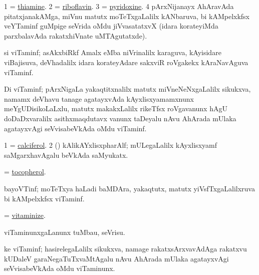 \noindent 
\gl{\pagu}
\expl{}
\bmng
\bnum
\num{1} = \hyperref{kandict_t.pdf}{T}{thiamine}{thiamine}. 
\num{2} = \hyperref{kandict_r.pdf}{R}{riboflavin}{riboflavin}. 
\num{3} = \hyperref{kandict_p.pdf}{P}{pyridoxine}{pyridoxine}. 
\num{4} pArxNijanayx AhAravAda pitatxjanakAMga, miVnu matutx moTeTxgaLalilx kANbaruva, bi kAMpelxkfsx veYTaminf guMpige seVrida oMdu jiVvasatatxvX (idara korateyiMda parxbalavAda rakatxhiVnate uMTAgutatxde). 
\enum
\emng
\eentry

\bentry
{}
\gl{\nA}
\expl{}
\bmng
 si viTaminf; asAkxbiRkf Amalx eMba niVrinalilx karaguva, kAyisidare viBajisuva, deVhadalilx idara korateyAdare sakxviR roVgakekx kAraNavAguva viTaminf. 
\emng
\eentry

\bentry
{}
\gl{\nA}
\expl{}
\bmng
Di viTaminf; pArxNigaLa yakaqtitxnalilx matutx miVneNeNxgaLalilx sikukxva, namamx deVhavu tanage agatayxvAda kAyxlisxyamamxnunx meYgUDisikoLaLxlu, matutx makakxLalilx rikeTfsx roVgavanunx hAgU doDaDxvaralilx asithxmaqdutavx  vanunx taDeyalu nAvu AhArada mUlaka agatayxvAgi seVvisabeVkAda oMdu viTaminf. 
\emng

\noindent 
\gl{\pagu}
\expl{}
\bmng
\bnum
\num{1} = \hyperref{kandict_c.pdf}{C}{calciferol}{calciferol}. 
\num{2} (\jiVra) kAlikAYxlisxpharAlf; mULegaLalilx kAyxlisxyamf saMgarxhavAgalu beVkAda saMyukatx. 
\enum
\emng
\eentry

\bentry
{}
\gl{\nA}
\expl{}
\bmng
 = \hyperref{kandict_t.pdf}{T}{tocopherol}{tocopherol}. 
\emng
\eentry

\bentry
{}
\gl{\nA}
\expl{}
\bmng
 bayoVTinf; moTeTxya haLadi baMDAra, yakaqtutx, matutx yiVsfTxgaLalilxruva bi kAMpelxkfsx viTaminf. 
\emng
\eentry

\bentry
{} 
\gl{\sakirx}
\expl{}
\bmng
 = \hyperlink{vitaminize}{vitaminize}. 
\emng
\eentry

\bentry
{} 
\gl{\sakirx}
\expl{}
\bmng
 viTaminunxgaLanunx tuMbau, seVrisu. 
\emng
\eentry

\bentry
{}
\gl{\nA}
\expl{}
\bmng
 ke viTaminf; hasirelegaLalilx sikukxva, namage rakatxsArxvavAdAga rakatxvu kUDaleV garaNegaTuTxvaMtAgalu nAvu AhArada mUlaka agatayxvAgi seVvisabeVkAda oMdu viTaminunx. 
\emng

